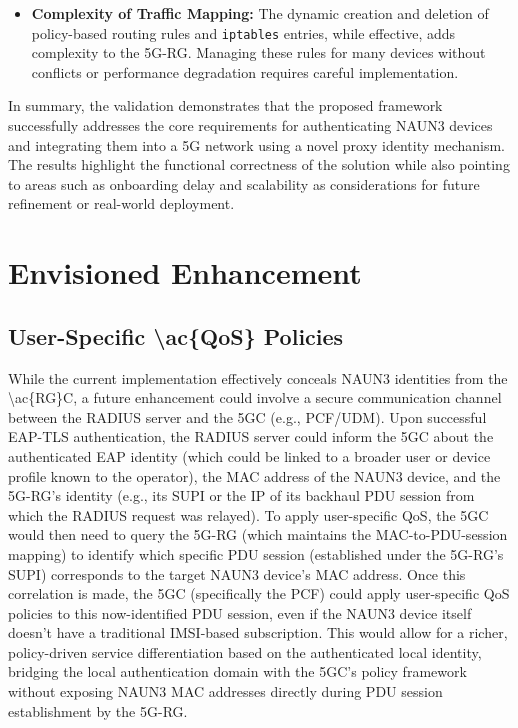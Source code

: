 \begin{itemize}
    \item \textbf{Complexity of Traffic Mapping:} The dynamic creation and deletion of policy-based routing rules and \texttt{iptables} entries, while effective, adds complexity to the \ac{5G-RG}. Managing these rules for many devices without conflicts or performance degradation requires careful implementation.
\end{itemize}

In summary, the validation demonstrates that the proposed framework successfully addresses the core requirements for authenticating \ac{NAUN3} devices and integrating them into a \ac{5G} network using a novel proxy identity mechanism. The results highlight the functional correctness of the solution while also pointing to areas such as onboarding delay and scalability as considerations for future refinement or real-world deployment.

\section{Envisioned Enhancement}

\subsection{User-Specific \ac{\ac{QoS}} Policies}

While the current implementation effectively conceals \ac{NAUN3} identities from the \ac{\ac{RG}C}, a future enhancement could involve a secure communication channel between the \ac{RADIUS} server and the \ac{5GC} (e.g., \ac{PCF}/\ac{UDM}). Upon successful \ac{EAP-TLS} authentication, the \ac{RADIUS} server could inform the \ac{5GC} about the authenticated \ac{EAP} identity (which could be linked to a broader user or device profile known to the operator), the \ac{MAC} address of the \ac{NAUN3} device, and the \ac{5G-RG}'s identity (e.g., its \ac{SUPI} or the \ac{IP} of its backhaul \ac{PDU} session from which the \ac{RADIUS} request was relayed). To apply user-specific \ac{QoS}, the \ac{5GC} would then need to query the \ac{5G-RG} (which maintains the \ac{MAC}-to-\ac{PDU}-session mapping) to identify which specific \ac{PDU} session (established under the \ac{5G-RG}'s \ac{SUPI}) corresponds to the target \ac{NAUN3} device's \ac{MAC} address. Once this correlation is made, the \ac{5GC} (specifically the \ac{PCF}) could apply user-specific \ac{QoS} policies to this now-identified \ac{PDU} session, even if the \ac{NAUN3} device itself doesn't have a traditional \ac{IMSI}-based subscription. This would allow for a richer, policy-driven service differentiation based on the authenticated local identity, bridging the local authentication domain with the \ac{5GC}'s policy framework without exposing \ac{NAUN3} \ac{MAC} addresses directly during \ac{PDU} session establishment by the \ac{5G-RG}.